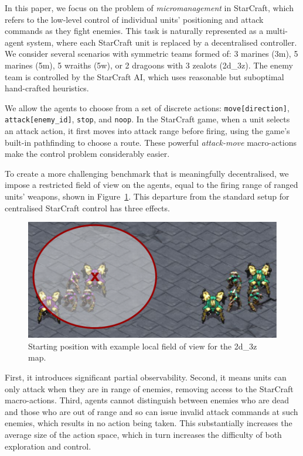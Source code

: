 \documentclass[letterpaper]{article}
\begin{document}
In this paper, we focus on the problem of \emph{micromanagement} in StarCraft,
which refers to the low-level control of individual units' positioning and
attack commands as they fight enemies. This task is naturally represented as a
multi-agent system, where each StarCraft unit is replaced by a decentralised
controller. We consider several scenarios with symmetric teams formed of: 3
marines (3m), 5 marines (5m), 5 wraiths (5w), or 2 dragoons with 3 zealots 
(2d\_3z). The enemy team is controlled by the StarCraft AI, which uses 
reasonable but suboptimal hand-crafted heuristics.

We allow the agents to choose from a set of discrete actions:
\texttt{move[direction]}, \texttt{attack[enemy\_id]}, \texttt{stop}, and
\texttt{noop}. In the StarCraft game, when a unit selects an attack action, it
first moves into attack range before firing, using the game's built-in
pathfinding to choose a route. These powerful \emph{attack-move} macro-actions
make the control problem considerably easier.
%

To create a more challenging benchmark that is meaningfully decentralised, we
impose a restricted field of view on the agents, equal to the firing range of
ranged units' weapons, shown in Figure~\ref{fig:setup}. This departure from the standard setup for
centralised StarCraft control has three effects.

\begin{figure}[h!]
    \begin{center}
        \includegraphics[width=1\linewidth]{shared/unites_start.pdf}
    \end{center}
    \caption{Starting position with example local field of view for the 2d\_3z map.}
    \label{fig:setup}
\end{figure}

First, it introduces significant partial observability. Second, it means units
can only attack when they are in range of enemies, removing access to the
StarCraft macro-actions. Third, agents cannot distinguish between enemies who
are dead and those who are out of range and so can issue invalid attack commands
at such enemies, which results in no action being taken. This substantially
increases the average size of the  action space, which in turn increases the
difficulty of both exploration and control.
\end{document}
